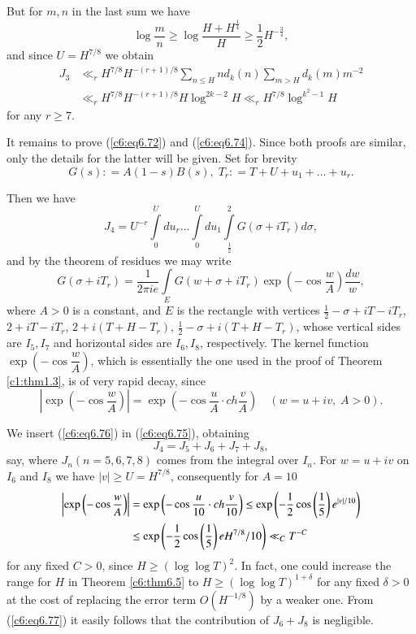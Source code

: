 But for $m,n$ in the last sum we have
$$
\log \frac{m}{n} \geq \log \frac{H+H^{\frac{1}{4}}}{H} \geq
\frac{1}{2} H^{-\frac{3}{4}}, 
$$
and since $U =H^{7/8}$ we obtain
\begin{align*}
 J_3 &  \ll_r H^{7/8} H^{-(r+1)/8} \sum\limits_{n \leq H} nd_k(n)
 \sum\limits_{m>H} d_k(m) m^{-2}\\ 
& \ll_r H^{7/8} H^{-(r+1)/8} H \log^{2k-2} H \ll_r H^{7/8}
 \log^{k^2-1} H 
\end{align*}
for any $r \geq 7$.

It remains to prove (\ref{c6:eq6.72}) and (\ref{c6:eq6.74}). Since
both proofs are similar, only the details for the latter will be
given. Set for brevity\pageoriginale 
$$
G(s) : = A (1-s) B (s), \; T_r : = T + U + u_1 + \ldots + u_r. 
$$ 

Then we have
\begin{equation}
J_4 = U^{-r} \int\limits^{U}_0 du_r \ldots \int\limits^{U}_0 du_1
\int\limits^2_{\frac{1}{2}} G(\sigma + iT_r) d \sigma ,
\label{c6:eq6.75} 
\end{equation}
and by the theorem of residues we may write 
\begin{equation}
G(\sigma+ iT_r) =\frac{1}{2\pi ie} \int\limits_E G(w+ \sigma + iT_r)
\exp \left(-\cos \frac{w}{A} \right) \frac{dw}{w},
\label{c6:eq6.76} 
\end{equation}
where $A > 0$ is a constant, and $E$ is the rectangle with vertices
$\frac{1}{2} - \sigma + iT - iT_r$, $2+iT-iT_r$, $2+i(T+H-T_r)$,
$\frac{1}{2} - \sigma + i (T+H-T_r)$, whose vertical sides are $I_5,
I_7$ and horizontal sides are $I_6, I_8$, respectively. The kernel
function $\exp \left(-\cos \dfrac{w}{A} \right)$, which is essentially
the one used in the proof of Theorem \ref{c1:thm1.3}, is of very rapid
decay, since 
$$
\left|\exp \left(-\cos \frac{w}{A} \right)\right| = \exp \left( -\cos
\frac{u}{A} \cdot ch \frac{v}{A}\right) \quad (w=u+iv, \; A > 0). 
$$

We insert (\ref{c6:eq6.76}) in (\ref{c6:eq6.75}), obtaining
$$
J_4 = J_5 + J_6 + J_7 + J_8,
$$
say, where $J_n (n = 5,6,7,8)$ comes from the integral over $I_n$. For
$w = u+ iv$ on $I_6$ and $I_8$ we have $|v| \geq U = H^{7/8}$,
consequently for $A = 10$ 
\begin{align}
\left|\exp \left(-\cos \frac{w}{A} \right)\right| &= \exp \left(-\cos
\frac{u}{10}\cdot ch \frac{v}{10}  \right) \leq \exp
\left(-\frac{1}{2} \cos \left(\frac{1}{5} \right) e^{|v|/10}
\right)\notag\\ 
&\leq \exp \left(-\frac{1}{2} \cos \left(\frac{1}{5} \right)  e
H^{7/8}/10\right) \ll_C T^{-C}\label{c6:eq6.77} 
\end{align}
for any fixed $C>0$, since $H \geq (\log \log T)^2$. In fact, one
could increase the range for $H$ in Theorem \ref{c6:thm6.5} to $H \geq
(\log \log T)^{1+\delta}$ for any fixed $\delta > 0$ at the cost of
replacing the error term $O(H^{-1/8})$ by a weaker one. From
(\ref{c6:eq6.77}) it easily follows that the contribution of $J_6 +
J_8$ is negligible. 

